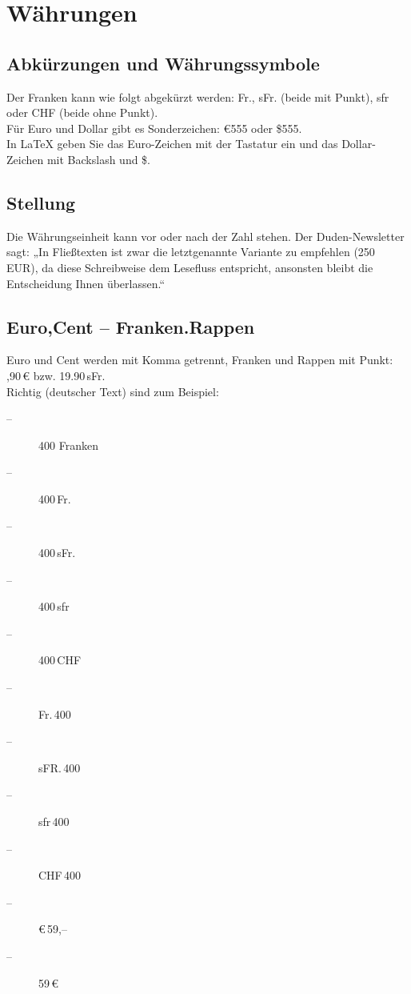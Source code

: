\section{Währungen}
\subsection{Abkürzungen und Währungssymbole}

Der Franken kann wie folgt abgekürzt werden: Fr., sFr. (beide mit Punkt), 
sfr oder CHF (beide ohne Punkt). \\

Für Euro und Dollar gibt es Sonderzeichen: €555 oder \$555. \\

In LaTeX geben Sie das Euro-Zeichen mit der Tastatur ein und das Dollar-Zeichen 
mit Backslash und \$.

\subsection{Stellung}
Die Währungseinheit kann vor oder nach der Zahl stehen. Der Duden-Newsletter sagt: 
„In Fließtexten ist zwar die letztgenannte Variante zu empfehlen (250 EUR), 
da diese Schreibweise dem Lesefluss entspricht, ansonsten bleibt die Entscheidung 
Ihnen überlassen.“

\subsection{Euro,Cent – Franken.Rappen}

Euro und Cent werden mit Komma getrennt, Franken und Rappen mit Punkt: \hfill {},90\,€ bzw. 19.90\,sFr. \\

Richtig (deutscher Text) sind zum Beispiel:
\begin{description}
  \item[--] 400 Franken
  \item[--] 400\,Fr. 
  \item[--] 400\,sFr.
  \item[--] 400\,sfr 
  \item[--] 400\,CHF
  \item[--] Fr.\,400
  \item[--] sFR.\,400 
  \item[--] sfr\,400
  \item[--] CHF\,400 
  \item[--] €\,59,–
  \item[--] 59\,€
\end{description}


